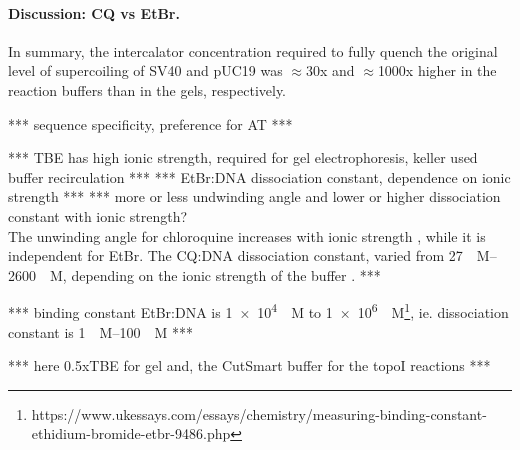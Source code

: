 \documentclass[10pt,a4]{article}
\def\cite#1{\hypersetup{citecolor=Teal}\citep{#1}} %
\newcommand{\M}{\textsc{M}}%
\newcommand{\uM}{\micro\textsc{M}}%
\newcommand{\TODO}[1]{\begingroup\color{red}*** #1 ***\endgroup}
\begin{document}
\paragraph{Discussion: CQ vs EtBr.}
In summary, the intercalator concentration required to fully quench
the original level of supercoiling of SV40 and pUC19 was $\approx$30x and
$\approx$1000x higher in the reaction buffers than in the gels,
respectively.

\TODO{sequence specificity, preference for AT}


\TODO{TBE has high ionic strength, required for gel electrophoresis,
keller used buffer recirculation}
\TODO{EtBr:DNA dissociation constant, dependence on ionic strength}
\TODO{more or less undwinding angle and lower or higher dissociation
  constant with ionic strength?\\ The unwinding angle for chloroquine
  increases with ionic strength \cite{Jones1980}, while it is
  independent for EtBr. The CQ:DNA dissociation constant, varied from
  \SIrange{27}{2600}{\uM}, depending on the ionic strength of the
  buffer \cite{KwakyeBerko1989}.}

\TODO{binding constant EtBr:DNA is \SI{1e4}{\per\M} to
  \SI{1e6}{\per\M}\footnote{https://www.ukessays.com/essays/chemistry/measuring-binding-constant-ethidium-bromide-etbr-9486.php},
  ie. dissociation constant is \SIrange{1}{100}{\uM}}

\TODO{here 0.5xTBE for gel and, the CutSmart buffer for the topoI
  reactions}
\end{document}
